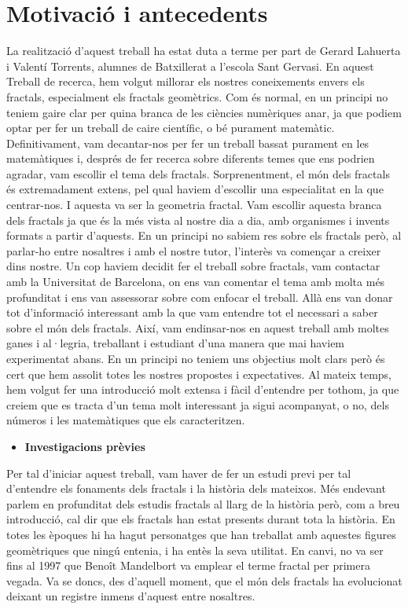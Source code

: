 \documentclass[12pt]{report}
\begin{document}
\section{Motivació i antecedents}
La realització d'aquest treball ha estat duta a terme per part de Gerard Lahuerta i Valentí Torrents, alumnes de Batxillerat a l'escola Sant Gervasi. En aquest Treball de recerca, hem volgut millorar els nostres coneixements envers els fractals, especialment els fractals geomètrics. Com és normal, en un principi no teniem gaire clar per quina branca de les ciències numèriques anar, ja que podiem optar per fer un treball de caire científic, o bé purament matemàtic. Definitivament, vam decantar-nos per fer un treball bassat purament en les matemàtiques i, després de fer recerca sobre diferents temes que ens podrien agradar, vam escollir el tema dels fractals. Sorprenentment, el món dels fractals és extremadament extens, pel qual haviem d'escollir una especialitat en la que centrar-nos. I aquesta va ser la geometria fractal. Vam escollir aquesta branca dels fractals ja que és la més vista al nostre dia a dia, amb organismes i invents formats a partir d'aquests.
\newline
En un principi no sabiem res sobre els fractals però, al parlar-ho entre nosaltres i amb el nostre tutor, l'interès va començar a creixer dins nostre. Un cop haviem decidit fer el treball sobre fractals, vam contactar amb la Universitat de Barcelona, on ens van comentar el tema amb molta més profunditat i ens van assessorar sobre com enfocar el treball. Allà ens van donar tot d'informació interessant amb la que vam entendre tot el necessari a saber sobre el món dels fractals.
\newline
Així, vam endinsar-nos en aquest treball amb moltes ganes i al·legria, treballant i estudiant d'una manera que mai haviem experimentat abans. En un principi no teniem uns objectius molt clars però és cert que hem assolit totes les nostres propostes i expectatives.
\newline
Al mateix temps, hem volgut fer una introducció molt extensa i fàcil d'entendre per tothom, ja que creiem que es tracta d'un tema molt interessant ja sigui acompanyat, o no, dels números i les matemàtiques que els caracteritzen.

\begin{itemize}
    \item \textbf{Investigacions prèvies}
\end{itemize}
Per tal d'iniciar aquest treball, vam haver de fer un estudi previ per tal d'entendre els fonaments dels fractals i la història dels mateixos. Més endevant parlem en profunditat dels estudis fractals al llarg de la història però, com a breu introducció, cal dir que els fractals han estat presents durant tota la història. En totes les èpoques hi ha hagut personatges que han treballat amb aquestes figures geomètriques que ningú entenia, i ha entès la seva utilitat.
\newline
En canvi, no va ser fins al 1997 que Benoît Mandelbort va emplear el terme fractal per primera vegada. Va se doncs, des d'aquell moment, que el món dels fractals ha evolucionat deixant un registre inmens d'aquest entre nosaltres.
\end{document}
